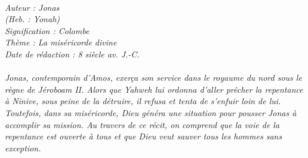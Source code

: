 \BFont
\noindent\hrulefill
{\footnotesize
\textit{
\bigskip
{\centering{}
\\Auteur : Jonas
\\(Heb. : Yonah)
\\Signification : Colombe
\\Thème : La miséricorde divine
\\Date de rédaction : 8 siècle av. J.-C.\\}
}
\textit{
\\Jonas, contemporain d'Amos, exerça son service dans le royaume du nord sous le règne de Jéroboam II. Alors que Yahweh lui ordonna d'aller prêcher la repentance à Ninive, sous peine de la détruire, il refusa et tenta de s'enfuir loin de lui. Toutefois, dans sa miséricorde, Dieu généra une situation pour pousser Jonas à accomplir sa mission. Au travers de ce récit, on comprend que la voie de la repentance est ouverte à tous et que Dieu veut sauver tous les hommes sans exception.\bigskip
}
}
\par\nobreak\noindent\hrulefill
